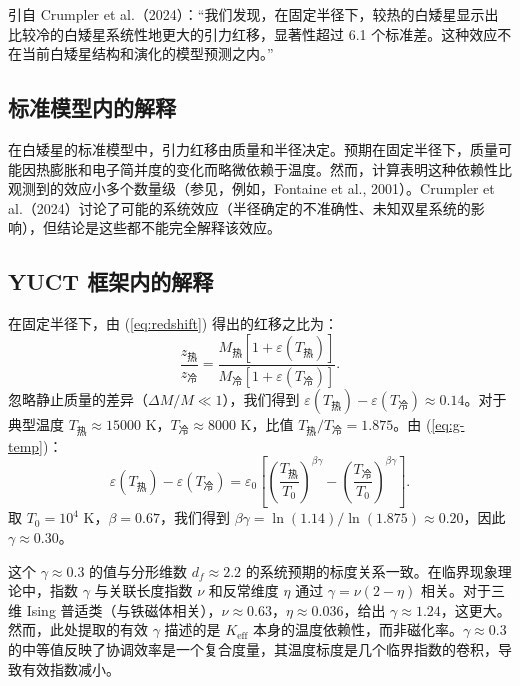 \documentclass[12pt]{article}
\theoremstyle{remark}
\newcommand{\Keff}{K_{\mathrm{eff}}}
\newcommand{\eps}{\varepsilon}
\newcommand{\df}{d_{\!f}}
\begin{document}
	引自 Crumpler et al.（2024）：“我们发现，在固定半径下，较热的白矮星显示出比较冷的白矮星系统性地更大的引力红移，显著性超过 6.1 个标准差。这种效应不在当前白矮星结构和演化的模型预测之内。”
	
	\subsection{标准模型内的解释}
	\label{subsec:wd-standard}
	
	在白矮星的标准模型中，引力红移由质量和半径决定。预期在固定半径下，质量可能因热膨胀和电子简并度的变化而略微依赖于温度。然而，计算表明这种依赖性比观测到的效应小多个数量级（参见，例如，Fontaine et al., 2001）。Crumpler et al.（2024）讨论了可能的系统效应（半径确定的不准确性、未知双星系统的影响），但结论是这些都不能完全解释该效应。
	
	\subsection{YUCT 框架内的解释}
	\label{subsec:wd-yuct}
	
	在固定半径下，由 (\ref{eq:redshift}) 得出的红移之比为：
	\begin{equation}
		\frac{z_{\text{热}}}{z_{\text{冷}}} = \frac{M_{\text{热}}[1+\eps(T_{\text{热}})]}{M_{\text{冷}}[1+\eps(T_{\text{冷}})]}.
		\label{eq:redshift-ratio}
	\end{equation}
	忽略静止质量的差异（$\Delta M/M \ll 1$），我们得到 $\eps(T_{\text{热}}) - \eps(T_{\text{冷}}) \approx 0.14$。对于典型温度 $T_{\text{热}} \approx 15000$ K，$T_{\text{冷}} \approx 8000$ K，比值 $T_{\text{热}}/T_{\text{冷}} = 1.875$。由 (\ref{eq:g-temp})：
	\begin{equation}
		\eps(T_{\text{热}}) - \eps(T_{\text{冷}}) = \eps_0 \left[ \left( \frac{T_{\text{热}}}{T_0} \right)^{\beta\gamma} - \left( \frac{T_{\text{冷}}}{T_0} \right)^{\beta\gamma} \right].
		\label{eq:eps-diff}
	\end{equation}
	取 $T_0 = 10^4$ K，$\beta = 0.67$，我们得到 $\beta\gamma = \ln(1.14) / \ln(1.875) \approx 0.20$，因此 $\gamma \approx 0.30$。
	
	这个 $\gamma \approx 0.3$ 的值与分形维数 $\df \approx 2.2$ 的系统预期的标度关系一致。在临界现象理论中，指数 $\gamma$ 与关联长度指数 $\nu$ 和反常维度 $\eta$ 通过 $\gamma = \nu(2-\eta)$ 相关。对于三维 Ising 普适类（与铁磁体相关），$\nu \approx 0.63$，$\eta \approx 0.036$，给出 $\gamma \approx 1.24$，这更大。然而，此处提取的有效 $\gamma$ 描述的是 $\Keff$ 本身的温度依赖性，而非磁化率。$\gamma \approx 0.3$ 的中等值反映了协调效率是一个复合度量，其温度标度是几个临界指数的卷积，导致有效指数减小。
	
\end{document}
